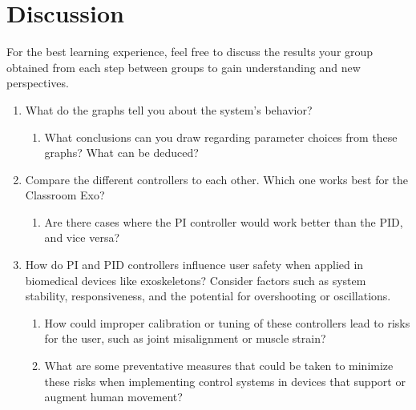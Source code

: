 \section{Discussion}
For the best learning experience, feel free to discuss the results your group obtained from each step between groups to gain understanding and new perspectives.
\begin{enumerate}
	\item What do the graphs tell you about the system’s behavior? 
	\begin{enumerate}[]
		\item What conclusions can you draw regarding parameter choices from these graphs? What can be deduced?
	\end{enumerate}
	\item Compare the different controllers to each other. Which one works best for the Classroom Exo? 
	\begin{enumerate}
		\item Are there cases where the PI controller would work better than the PID, and vice versa?
	\end{enumerate}
	\item How do PI and PID controllers influence user safety when applied in biomedical devices like exoskeletons? Consider factors such as system stability, responsiveness, and the potential for overshooting or oscillations.
	\begin{enumerate}[]
		\item How could improper calibration or tuning of these controllers lead to risks for the user, such as joint misalignment or muscle strain?
		\item What are some preventative measures that could be taken to minimize these risks when implementing control systems in devices that support or augment human movement?
	\end{enumerate}
\end{enumerate}



